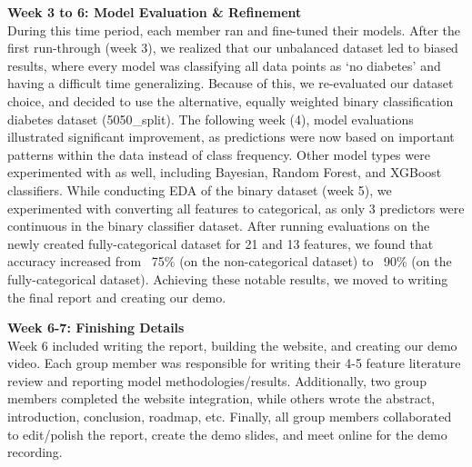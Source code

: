 \documentclass[conference]{IEEEtran}
\begin{document}
\noindent\textbf{Week 3 to 6: Model Evaluation \& Refinement}\\
During this time period, each member ran and fine-tuned their models. After the first run-through (week 3), we realized that our unbalanced dataset led to biased results, where every model was classifying all data points as ‘no diabetes’ and having a difficult time generalizing. Because of this, we re-evaluated our dataset choice, and decided to use the alternative, equally weighted binary classification diabetes dataset (5050\_split). The following week (4), model evaluations illustrated significant improvement, as predictions were now based on important patterns within the data instead of class frequency. Other model types were experimented with as well, including Bayesian, Random Forest, and XGBoost classifiers. While conducting EDA of the binary dataset (week 5), we experimented with converting all features to categorical, as only 3 predictors were continuous in the binary classifier dataset. After running evaluations on the newly created fully-categorical dataset for 21 and 13 features, we found that accuracy increased from ~75\% (on the non-categorical dataset) to ~90\% (on the fully-categorical dataset). Achieving these notable results, we moved to writing the final report and creating our demo.

\vspace{1em}

\noindent\textbf{Week 6-7: Finishing Details}\\
Week 6 included writing the report, building the website, and creating our demo video. Each group member was responsible for writing their 4-5 feature literature review and reporting model methodologies/results. Additionally, two group members completed the website integration, while others wrote the abstract, introduction, conclusion, roadmap, etc. Finally, all group members collaborated to edit/polish the report, create the demo slides, and meet online for the demo recording.



\end{document}
